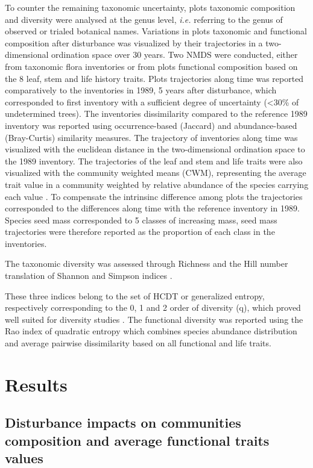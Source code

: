 \documentclass[fleqn,10pt]{ArtEcoFoG} %
\theoremstyle{definition}
\theoremstyle{definition}
\theoremstyle{definition}
\theoremstyle{remark}
\begin{document}
To counter the remaining taxonomic uncertainty, plots taxonomic
composition and diversity were analysed at the genus level, \emph{i.e.}
referring to the genus of observed or trialed botanical names.
Variations in plots taxonomic and functional composition after
disturbance was visualized by their trajectories in a two-dimensional
ordination space over 30 years. Two NMDS were conducted, either from
taxonomic flora inventories or from plots functional composition based
on the 8 leaf, stem and life history traits. Plots trajectories along
time was reported comparatively to the inventories in 1989, 5 years
after disturbance, which corresponded to first inventory with a
sufficient degree of uncertainty (\textless{}30\% of undetermined
trees). The inventories dissimilarity compared to the reference 1989
inventory was reported using occurrence-based (Jaccard) and
abundance-based (Bray-Curtis) similarity measures. The trajectory of
inventories along time was visualized with the euclidean distance in the
two-dimensional ordination space to the 1989 inventory. The trajectories
of the leaf and stem and life traits were also visualized with the
community weighted means (CWM), representing the average trait value in
a community weighted by relative abundance of the species carrying each
value \citep{Diaz2007, Garnier2004}. To compensate the intrinsinc
difference among plots the trajectories corresponded to the differences
along time with the reference inventory in 1989. Species seed mass
corresponded to 5 classes of increasing mass, seed mass trajectories
were therefore reported as the proportion of each class in the
inventories.

The taxonomic diversity was assessed through Richness and the Hill
number translation of Shannon and Simpson indices \citep{Hill1973}.

These three indices belong to the set of HCDT or generalized entropy,
respectively corresponding to the 0, 1 and 2 order of diversity (q),
which proved well suited for diversity studies
\citep{Patil1982, Tothmeresz1995}. The functional diversity was reported
using the Rao index of quadratic entropy which combines species
abundance distribution and average pairwise dissimilarity based on all
functional and life traits.

\section{Results}\label{results}

\subsection{Disturbance impacts on communities composition and average
functional traits
values}\label{disturbance-impacts-on-communities-composition-and-average-functional-traits-values}
\end{document}
